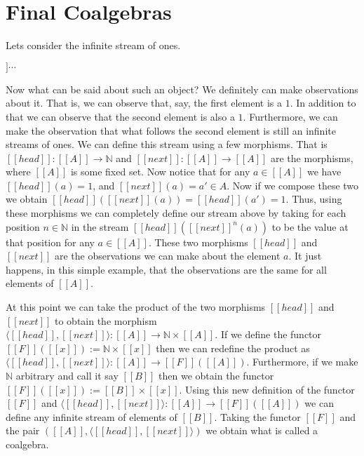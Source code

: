 \section{Final Coalgebras}
\label{sec:final_coalgebras}
Lets consider the infinite stream of ones. 
\begin{center}
  \begin{math}
    [[1 :: 1 :: 1 :: 1]] \cdots
  \end{math}
\end{center}
Now what can be said about such an object?  We definitely can make observations about it.
That is, we can observe that, say, the first element is a $1$.  In addition to that we can 
observe that the second element is also a $1$.  Furthermore, we can make the observation 
that what follows the second element is still an infinite streams of ones.
We can define this stream using a few morphisms.  That is $[[head]] : [[A]] \to \mathbb{N}$ and
$[[next]] : [[A]] \to [[A]]$ are the morphisms, where $[[A]]$ is some fixed set.
Now notice that for any $a \in [[A]]$ we have $[[head]](a) = 1$, and 
$[[next]](a) = a' \in A$.  Now if we compose these two we obtain 
$[[head]]([[next]](a)) = [[head]](a') = 1$.  Thus, using these morphisms we can completely
define our stream above by taking for each position $n \in \mathbb{N}$ in the stream 
$[[head]]([[next]]^{n}(a))$ to be the value at that position for any $a \in [[A]]$.  These
two morphisms $[[head]]$ and $[[next]]$ are the observations we can make about the element 
$a$. It just happens, in this simple example, that the observations are the same for all 
elements of $[[A]]$.

At this point we can take the product of the two morphisms $[[head]]$ and $[[next]]$ to
obtain the morphism $\langle [[head]],[[next]] \rangle : [[A]] \to \mathbb{N} \times [[A]]$.
If we define the functor $[[F]]([[x]]) := \mathbb{N} \times [[x]]$ then we can redefine the
product as $\langle [[head]],[[next]] \rangle : [[A]] \to [[F]]([[A]])$.  Furthermore,
if we make $\mathbb{N}$ arbitrary and call it say $[[B]]$ then we obtain 
the functor $[[F]]([[x]]) := [[B]] \times [[x]]$.  Using this new definition of the functor
$[[F]]$ and $\langle [[head]],[[next]] \rangle : [[A]] \to [[F]]([[A]])$ we can define any
infinite stream of elements of $[[B]]$.  Taking the functor $[[F]]$ and the pair
$([[A]], \langle [[head]], [[next]] \rangle)$ we obtain what is called a coalgebra.

